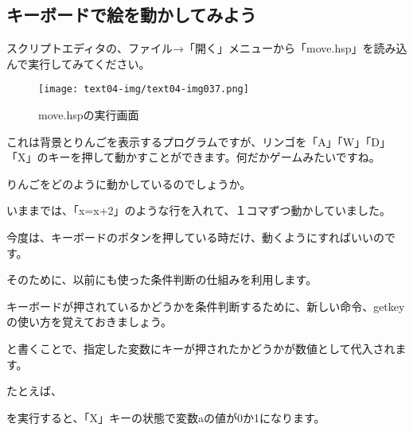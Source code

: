 \newpage
\subsection{キーボードで絵を動かしてみよう}

スクリプトエディタの、ファイル→「開く」メニューから「move.hsp」を読み込んで実行してみてください。


\begin{figure}[H]
    \begin{center}
      \texttt{[image: text04-img/text04-img037.png]}
      \caption{move.hspの実行画面}
    \end{center}
    \label{fig:prog_menu}
\end{figure}

これは背景とりんごを表示するプログラムですが、リンゴを「A」「W」「D」「X」のキーを押して動かすことができます。何だかゲームみたいですね。

りんごをどのように動かしているのでしょうか。

いままでは、「x=x+2」のような行を入れて、１コマずつ動かしていました。

今度は、キーボードのボタンを押している時だけ、動くようにすればいいのです。

そのために、以前にも使った条件判断の仕組みを利用します。

キーボードが押されているかどうかを条件判断するために、新しい命令、getkeyの使い方を覚えておきましょう。

\begin{description}
    \item {}
\end{description}

と書くことで、指定した変数にキーが押されたかどうかが数値として代入されます。

たとえば、


\begin{description}
    \item {}
\end{description}


を実行すると、「X」キーの状態で変数aの値が0か1になります。


\begin{description}
    \item {}
    \item {}
\end{description}

